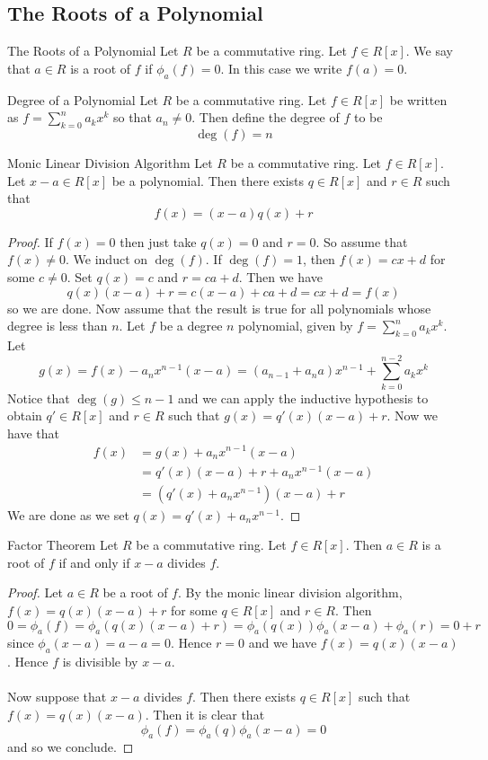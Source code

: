 \documentclass[a4paper]{article}
\begin{document}
\subsection{The Roots of a Polynomial}
\begin{defn}{The Roots of a Polynomial}{} Let $R$ be a commutative ring. Let $f\in R[x]$. We say that $a\in R$ is a root of $f$ if $\phi_a(f)=0$. In this case we write $f(a)=0$. 
\end{defn}

\begin{defn}{Degree of a Polynomial}{} Let $R$ be a commutative ring. Let $f\in R[x]$ be written as $f=\sum_{k=0}^n a_kx^k$ so that $a_n\neq 0$. Then define the degree of $f$ to be $$\deg(f)=n$$
\end{defn}

\begin{thm}{Monic Linear Division Algorithm}{} Let $R$ be a commutative ring. Let $f\in R[x]$. Let $x-a\in R[x]$ be a polynomial. Then there exists $q\in R[x]$ and $r\in R$ such that $$f(x)=(x-a)q(x)+r$$ \tcbline
\begin{proof}
If $f(x)=0$ then just take $q(x)=0$ and $r=0$. So assume that $f(x)\neq 0$. We induct on $\deg(f)$. If $\deg(f)=1$, then $f(x)=cx+d$ for some $c\neq 0$. Set $q(x)=c$ and $r=ca+d$. Then we have $$q(x)(x-a)+r=c(x-a)+ca+d=cx+d=f(x)$$ so we are done. Now assume that the result is true for all polynomials whose degree is less than $n$. Let $f$ be a degree $n$ polynomial, given by $f=\sum_{k=0}^na_kx^k$. Let $$g(x)=f(x)-a_nx^{n-1}(x-a)=(a_{n-1}+a_na)x^{n-1}+\sum_{k=0}^{n-2}a_kx^k$$ Notice that $\deg(g)\leq n-1$ and we can apply the inductive hypothesis to obtain $q'\in R[x]$ and $r\in R$ such that $g(x)=q'(x)(x-a)+r$. Now we have that 
\begin{align*}
f(x)&=g(x)+a_nx^{n-1}(x-a)\\
&=q'(x)(x-a)+r+a_nx^{n-1}(x-a)\\
&=\left(q'(x)+a_nx^{n-1}\right)(x-a)+r
\end{align*}
We are done as we set $q(x)=q'(x)+a_nx^{n-1}$. 
\end{proof}
\end{thm}

\begin{thm}{Factor Theorem}{} Let $R$ be a commutative ring. Let $f\in R[x]$. Then $a\in R$ is a root of $f$ if and only if $x-a$ divides $f$. \tcbline
\begin{proof}
Let $a\in R$ be a root of $f$. By the monic linear division algorithm, $f(x)=q(x)(x-a)+r$ for some $q\in R[x]$ and $r\in R$. Then $$0=\phi_a(f)=\phi_a(q(x)(x-a)+r)=\phi_a(q(x))\phi_a(x-a)+\phi_a(r)=0+r$$ since $\phi_a(x-a)=a-a=0$. Hence $r=0$ and we have $f(x)=q(x)(x-a)$. Hence $f$ is divisible by $x-a$. \\~\\

Now suppose that $x-a$ divides $f$. Then there exists $q\in R[x]$ such that $f(x)=q(x)(x-a)$. Then it is clear that $$\phi_a(f)=\phi_a(q)\phi_a(x-a)=0$$ and so we conclude. 
\end{proof}
\end{thm}
\end{document}
